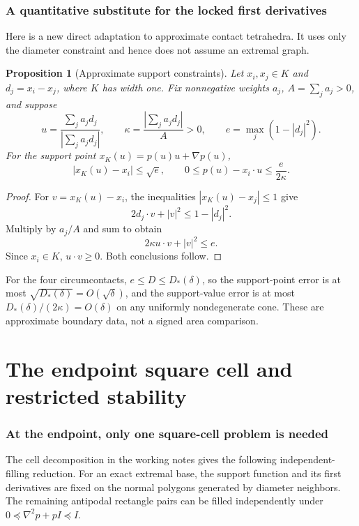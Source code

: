 \documentclass[11pt]{article}
\newtheorem{proposition}[theorem]{Proposition}
\theoremstyle{remark}\newtheorem{remark}[theorem]{Remark}
\begin{document}
\section{A quantitative substitute for the locked first derivatives}
Here is a new direct adaptation to approximate contact tetrahedra. It uses only the diameter constraint and hence does not assume an extremal graph.

\begin{proposition}[Approximate support constraints]\label{approx:locking}
Let $x_i,x_j\in K$ and $d_j=x_i-x_j$, where $K$ has width one. Fix nonnegative weights $a_j$, $A=\sum_j a_j>0$, and suppose
\[
 u=\frac{\sum_j a_jd_j}{|\sum_j a_jd_j|},\qquad
 \kappa=\frac{|\sum_j a_jd_j|}{A}>0,\qquad
 e=\max_j(1-|d_j|^2).
\]
For the support point $x_K(u)=p(u)u+\nabla p(u)$,
\begin{equation}\label{approx:jetbounds}
 |x_K(u)-x_i|\leq\sqrt e,\qquad
 0\leq p(u)-x_i\cdot u\leq\frac{e}{2\kappa}.
\end{equation}
\end{proposition}
\begin{proof}
For $v=x_K(u)-x_i$, the inequalities $|x_K(u)-x_j|\leq1$ give
\[
 2d_j\cdot v+|v|^2\leq1-|d_j|^2.
\]
Multiply by $a_j/A$ and sum to obtain
\[
 2\kappa u\cdot v+|v|^2\leq e.
\]
Since $x_i\in K$, $u\cdot v\geq0$. Both conclusions follow.
\end{proof}
For the four circumcontacts, $e\leq D\leq D_*(\delta)$, so the support-point error is at most $\sqrt{D_*(\delta)}=O(\sqrt\delta)$, and the support-value error is at most $D_*(\delta)/(2\kappa)=O(\delta)$ on any uniformly nondegenerate cone. These are approximate boundary data, not a signed area comparison.

\part{The endpoint square cell and restricted stability}

\section{At the endpoint, only one square-cell problem is needed}
The cell decomposition in the working notes \cite{Local} gives the following independent-filling reduction. For an exact extremal base, the support function and its first derivatives are fixed on the normal polygons generated by diameter neighbors. The remaining antipodal rectangle pairs can be filled independently under $0\preceq\nabla^2p+pI\preceq I$.
\end{document}
